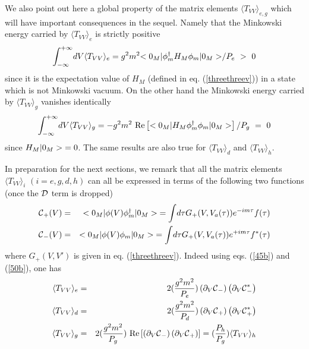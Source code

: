 We also point out here a global property of the matrix elements
$\langle T_{VV}\rangle _{e,  g}$ which will have important consequences
in the sequel. Namely that the Minkowski energy carried by $\langle
T_{VV}\rangle _e$ is strictly positive  \begin{eqnarray}
\int^{+\infty}_{-\infty}\! dV \langle T_{VV}\rangle _e
= g^2m^2 \mbox{$ < 0_M \vert $} \phi_m^\dagger H_M \phi_m
\mbox{$ \vert 0_M > $}/ P_e\ >\ 0
\label{pos1}
\end{eqnarray}
since it is the expectation value of $H_M$ (defined in eq.
(\ref{threethreev})) in a
state which is not Minkowski vacuum. On the other hand the Minkowski energy
carried by $\langle T_{VV}\rangle _g$ vanishes identically
\begin{eqnarray}
\int^{+\infty}_{-\infty}\! dV \langle T_{VV}\rangle _g
= -g^2m^2 \mbox{ Re} \left[ \mbox{$ < 0_M \vert $}  H_M \phi_m^\dagger \phi_m
\mbox{$ \vert 0_M > $}\right]/ P_g \ =\ 0
\label{pos2}
\end{eqnarray}
since $H_M \mbox{$ \vert 0_M > $}=0$. The same results are also true for
$\langle T_{VV}\rangle _{d}$ and $\langle T_{VV}\rangle _{h}$.

In preparation for the next sections,
we remark that
all the matrix elements $\langle T_{VV}\rangle _i$  $(i=e, g, d, h)$
can all be expressed in terms of the following two functions (once the ${\cal
{D}}$
term
is dropped)
\begin{eqnarray}
\mbox{$\cal C $}_+ (V) &=& \mbox{$ \mbox{$ < 0_M \vert $} \phi(V) \phi_m^\dagger  \mbox{$ \vert 0_M > $} $}
=
\int \! d\tau G_+(V,V_a (\tau)) e^{-i m \tau} f(\tau) \nonumber\\ \mbox{$\cal C $}_-(V) &=&
\mbox{$ \mbox{$ < 0_M \vert $} \phi(V) \phi_m \mbox{$ \vert 0_M > $} $}
=
\int \! d\tau
G_+(V,V_a (\tau)) e^{+i m \tau} f^*(\tau) \label{threefivexiv} \end{eqnarray}
where $G_+(V,V')$ is given in eq. (\ref{threethreev}).
Indeed using eqs. (\ref{45b}) and (\ref{50b}), one has
\begin{eqnarray}
\langle T_{VV}\rangle _{e} &=&2 ({ g^2m^2 \over P_e})
\left( \partial_V \mbox{$\cal C $}_- \right) \left( \partial_V \mbox{$\cal C $}_-^* \right)
\nonumber\\
\langle T_{VV}\rangle _{d} &=&2 ({ g^2m^2 \over P_d})
\left( \partial_V \mbox{$\cal C $}_+\right) \left( \partial_V \mbox{$\cal C $}_+^* \right)
\nonumber\\
\langle T_{VV} \rangle _{g}
&=& 2 ({g^2m^2 \over P_g}) \mbox{ Re} \left[\left(  \partial_V \mbox{$\cal C $}_- \right)
\left( \partial_V \mbox{$\cal C $}_+
\right)\right]
= ({P_h \over P_g} ) \langle T_{VV} \rangle _{h}
\label{TVVi}
\end{eqnarray}


